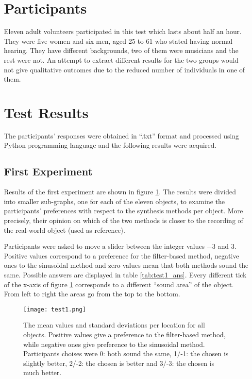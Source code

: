 \section{Participants}
Eleven adult volunteers participated in this test which lasts about half an hour. They were five women and six men, aged $25$ to $61$ who stated having normal hearing. They have different backgrounds, two of them were musicians and the rest were not. An attempt to extract different results for the two groups would not give qualitative outcomes due to the reduced number of individuals in one of them.


\section{Test Results}\label{sec:testresults}
The participants' responses were obtained in ``.txt'' format and processed using Python programming language and the following results were acquired.


\subsection{First Experiment}
Results of the first experiment are shown in figure \ref{fig:test1}. The results were divided into smaller sub-graphs, one for each of the eleven objects, to examine the participants' preferences with respect to the synthesis methods per object. More precisely, their opinion on which of the two methods is closer to the recording of the real-world object (used as reference).

Participants were asked to move a slider between the integer values $-3$ and $3$. Positive values correspond to a preference for the filter-based method, negative ones to the sinusoidal method and zero values mean that both methods sound the same. Possible answers are displayed in table \ref{tab:test1_ans}. Every different tick of the x-axis of figure \ref{fig:test1} corresponds to a different ``sound area'' of the object. From left to right the areas go from the top to the bottom.

\begin{figure}[H]
  \centering
    \texttt{[image: test1.png]}
      \caption{The mean values and standard deviations per location for all objects. Positive values give a preference to the filter-based method, while negative ones give preference to the sinusoidal method. Participants choises were 0: both sound the same, 1/-1: the chosen is slightly better, 2/-2: the chosen is better and 3/-3: the chosen is much better.}\label{fig:test1}
\end{figure}

